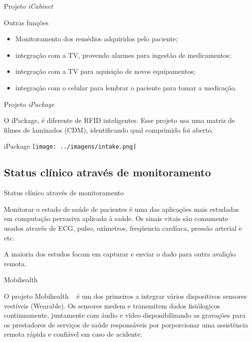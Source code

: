 \documentclass{beamer}
\begin{document}
\begin{frame}{Projeto \textit{iCabinet}}
  \begin{block}{Outras funções}
   \begin{itemize}[<+->]
    \item Monitoramento dos remédios adquiridos pelo paciente;
    \item integração com a TV, provendo alarmes para ingestão de medicamentos;
    \item integração com a TV para aquisição de novos equipamentos;
    \item integração com o celular para lembrar o paciente para tomar a medicação.
   \end{itemize}
  \end{block}
\end{frame}

\begin{frame}{Projeto \textit{iPackage}}
  \begin{block}{}
    O iPackage, é diferente de RFID inteligentes. Esse projeto usa uma matriz de filmes de laminados (CDM), identificando qual comprimido foi aberto.
  \end{block}

  \begin{block}{iPackage}
      \center \texttt{[image: ../imagens/intake.png]}
  \end{block}
\end{frame}

\subsection{Status clínico através de monitoramento}
\begin{frame}{Status clínico através de monitoramento}
  \begin{block}{}
      Monitorar o estado de saúde de pacientes é uma das aplicações mais estudadas em computação pervasiva aplicada à saúde. Os sinais vitais são comumente usados através de ECG, pulso, oxímetros, freqüencia cardíaca, pressão arterial e etc.   
  \end{block}

  \begin{alertblock}{}
    A maioria dos estudos focam em capturar e enviar o dado para outra avalição remota.
  \end{alertblock}
\end{frame}

\begin{frame}{Mobihealth}
  \begin{block}{}
  O projeto Mobihealth ~\cite{mobhealth} é um dos primeiros a integrar vários dispositivos sensores vestíveis (Wearable).
    Os sensores medem e transmitem dados fisiólogicos continuamente, juntamente com áudio e vídeo disponibilizando as gravações para os prestadores de serviços de saúde responsáveis por porporcionar uma assistência remota rápida e confiável em caso de acidente.
  \end{block}
\end{frame}
\end{document}
